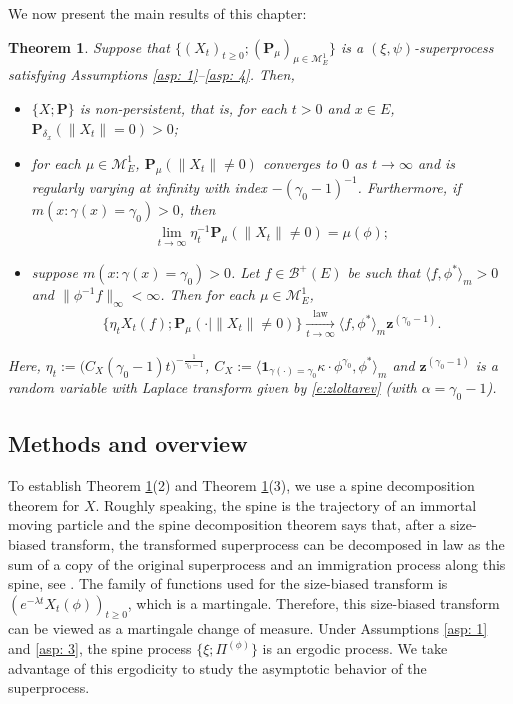 \documentclass[UTF8]{pkuthss}
\theoremstyle{plain}
\newtheorem{thm}{Theorem}[section]
\theoremstyle{definition}
\numberwithin{equation}{section}
\begin{document}
	We now present the main results of this chapter:

\begin{thm} \label{thm: main theorem}
	Suppose that $\{(X_t)_{t\geq 0}; (\mathbf P_\mu)_{\mu \in \mathcal M_E^1}\}$ is a $(\xi, \psi)$-superprocess satisfying Assumptions \ref{asp: 1}--\ref{asp: 4}.
	Then,
\begin{itemize}
\item[(1)]
	$\{X; \mathbf P\}$ is non-persistent, that is, for each $t > 0$ and $x\in E$,
	$\mathbf P_{\delta_x}( \| X_t\| = 0) > 0$;
\item[(2)]
	for each $\mu \in \mathcal M^1_E$, $\mathbf P_{\mu}(\|X_t\| \neq 0)$ converges to
	$0$ as $t \to \infty$ and is regularly varying at infinity with index $-(\gamma_0-1)^{-1}$.
	Furthermore, if $m(x: \gamma (x)= \gamma_0)>0$, then
\begin{align}
	\lim_{t\to\infty} \eta_t^{-1}\mathbf P_{\mu}(\|X_t\| \neq 0)
	=\mu(\phi);
\end{align}
\item[(3)]
	suppose $m( x:\gamma(x)=\gamma_0 )>0$.
	Let $f \in \mathscr B^+(E)$ be such that $\langle f, \phi^* \rangle_m > 0$ and $\| \phi^{-1}f \|_\infty < \infty$. Then for each $\mu \in \mathcal M_E^1$,
\begin{align}
	\{\eta_t X_t(f) ; \mathbf P_{\mu}(\cdot |\|X_t\| \neq 0) \}
	\xrightarrow[t\to \infty]{\operatorname{law}} \langle f, \phi^*\rangle_m \mathbf z^{(\gamma_0 - 1)}.
\end{align}
\end{itemize}
	Here, $\eta_t := \big( C_X(\gamma_0 - 1) t \big)^{- \frac {1} {\gamma_0 - 1} }$, $C_X := \langle \mathbf 1_{\gamma(\cdot) = \gamma_0} \kappa\cdot \phi^{\gamma_0}, \phi^* \rangle_m$ 
	and $\mathbf z^{(\gamma_0 - 1)}$ is a random variable with Laplace transform given by \eqref{e:zloltarev} 
	(with $\alpha=\gamma_0 -1$).

\end{thm}

\subsection{Methods and overview}
	
	To establish Theorem \ref{thm: main theorem}(2) and Theorem \ref{thm: main theorem}(3), we use a spine decomposition theorem for 	$X$.
	Roughly speaking, the spine is the trajectory of an immortal moving particle and the spine decomposition theorem says that, after a size-biased transform, the transformed superprocess can be decomposed in law as the sum of a copy of the original superprocess and an immigration process along this spine, see \cite{EckhoffKyprianouWinkel2015Spines, EnglanderKyprianou2004Local, LiuRenSong2009LlogL}.
	The family of functions used for the size-biased transform is $(e^{-\lambda t} X_t(\phi))_{t\geq 0}$, which is a martingale.
	Therefore, this size-biased transform can be viewed as a martingale change of measure.
	Under Assumptions \ref{asp: 1} and \ref{asp: 3}, the spine process $\{\xi; \Pi^{(\phi)}\}$ is an ergodic process.
	We take advantage of this ergodicity to study the asymptotic behavior of the superprocess.
	
\end{document}
